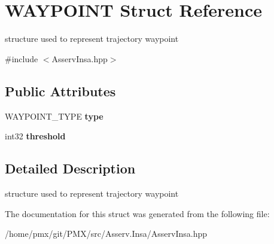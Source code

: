 \hypertarget{structWAYPOINT}{}\section{W\+A\+Y\+P\+O\+I\+NT Struct Reference}
\label{structWAYPOINT}


structure used to represent trajectory waypoint  




{\ttfamily \#include $<$Asserv\+Insa.\+hpp$>$}

\subsection*{Public Attributes}
\begin{DoxyCompactItemize}
\item 
\mbox{\label{structWAYPOINT_a06c9b1d7cb338a5a987a2f3839271262}} 
W\+A\+Y\+P\+O\+I\+N\+T\+\_\+\+T\+Y\+PE {\bfseries type}
\item 
\mbox{\label{structWAYPOINT_a14eb59f999d038e098ceb4fb3fe096d5}} 
int32 {\bfseries threshold}
\end{DoxyCompactItemize}


\subsection{Detailed Description}
structure used to represent trajectory waypoint 

The documentation for this struct was generated from the following file\+:\begin{DoxyCompactItemize}
\item 
/home/pmx/git/\+P\+M\+X/src/\+Asserv.\+Insa/Asserv\+Insa.\+hpp\end{DoxyCompactItemize}
